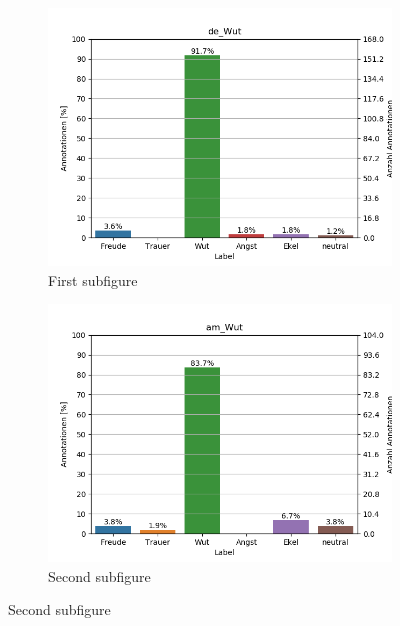 \documentclass[11pt,a4paper,headsepline,twoside,toc=bibliography]{scrreprt}
\begin{document}
\begin{figure}[t!] %
	\begin{subfigure}{0.48\textwidth}
		\includegraphics[width=\linewidth]{plots/de_Wut.png}
		\caption{First subfigure} \label{fig:de_W}
	\end{subfigure}\hspace*{\fill}
	\begin{subfigure}{0.48\textwidth}
		\includegraphics[width=\linewidth]{plots/am_Wut.png}
		\caption{Second subfigure} \label{fig:am_W}
	\end{subfigure}
	

\end{figure}
\end{document}
